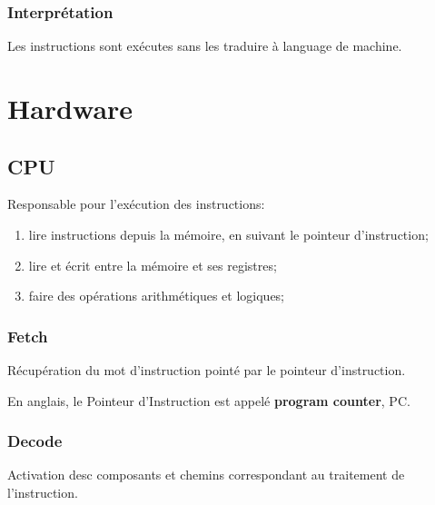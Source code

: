 \documentclass{article}
\begin{document}
\subsubsection{Interprétation}
\begin{definition}
    Les instructions sont exécutes sans les traduire à language de machine.
\end{definition}



\section{Hardware}


\subsection{CPU}
\begin{definition}\label{def:CPU}
    Responsable pour l'exécution des instructions:
    \begin{enumerate}[noitemsep]
        \item lire instructions depuis la mémoire, en suivant le pointeur d'instruction;
        \item lire et écrit entre la mémoire et ses registres;
        \item faire des opérations arithmétiques et logiques;
    \end{enumerate}
\end{definition}

\subsubsection{Fetch}
\begin{definition}\label{def:fetch}
    Récupération du mot d'instruction pointé par le pointeur d'instruction.

    \begin{remark}\label{def:PC}
        En anglais, le Pointeur d'Instruction est appelé \textbf{program counter}, PC.
    \end{remark}
\end{definition}

\subsubsection{Decode}
\begin{definition}\label{def:decode}
    Activation desc composants et chemins correspondant au traitement de l'instruction.
\end{definition}
\end{document}
